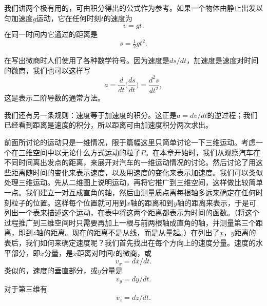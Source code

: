 我们讲两个极有用的，可由积分得出的公式作为参考。如果一个物体由静止出发以匀加速度$g$运动，它在任何时刻$t$的速度为
\begin{equation*}
v=gt.
\end{equation*}
在同一时间内它通过的距离是
\begin{equation*}
s=\tfrac{1}{2}gt^2.
\end{equation*}

在写出微商时人们使用了各种数学符号。因为速度是$ds/dt$，加速度是速度对时间的微商，我们也可以这样写
\begin{equation}
\label{Eq:I:8:10}
a=\frac{d}{dt}\biggl(\frac{ds}{dt}\biggr)=\frac{d^2s}{dt^2},
\end{equation}
这是表示二阶导数的通常方法。

我们还有另一条规则：速度等于加速度的积分。这正是$a=dv/dt$的逆过程；我们已经看到距离是速度的积分，所以距离可由加速度积分两次求出。

前面所讨论的运动只是一维情况，限于篇幅这里只简单讨论一下三维运动。考虑一个在三维空间中以无论什么方式运动的粒子$P$。在本章开始时，我们从观察汽车在不同时间离出发点的距离，来展开对汽车的一维运动情况的讨论。然后讨论了用这些距离随时间的变化来表示速度，以及用速度的变化来表示加速度。我们可以类似处理三维运动。先从二维图上说明运动，再将它推广到三维空间，这样做比较简单一点。我们建立一对互成直角的轴，然后由测量质点离每根轴多远来确定在任何时刻粒子的位置。这样每个位置就可用到$x$轴的距离和到$y$轴的距离来表示，于是可列出一个表来描述这个运动，在表中将这两个距离都表示为时间的函数。（将这个过程推广到三维空间时只需要再加上一根与前两根轴成直角的轴，并测量第三个距离，即到$z$轴的距离。现在的距离不是从线，而是从量起。）在列出了$x$，$y$距离的表后，我们如何来确定速度呢？我们首先找出在每个方向上的速度分量。速度的水平部分，即$x$分量，是$x$距离对时间$t$的微商，或
\begin{equation}
\label{Eq:I:8:11}
v_x =dx/dt.
\end{equation}
类似的，速度的垂直部分，或$y$分量是
\begin{equation}
\label{Eq:I:8:12}
v_y = dy/dt.
\end{equation}
对于第三维有
\begin{equation}
\label{Eq:I:8:13}
v_z = dz/dt.
\end{equation}

